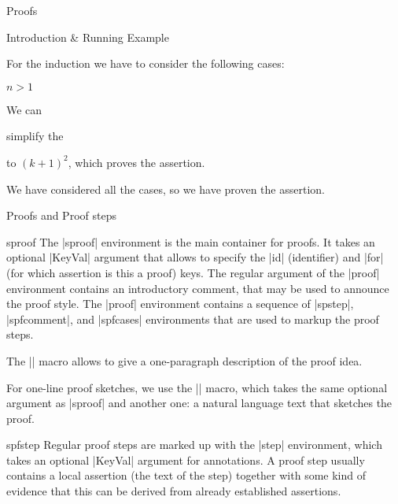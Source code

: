 \begin{sfragment}{Proofs}
\begin{sfragment}{Introduction \& Running Example}
\begin{mdframed}
\begin{sproof}[id=simple-proof]
\begin{spfcases}{For the induction we have to consider the following cases:}
\begin{spfcase}{$n>1$}
\begin{spfstep}[type=conclusion]
       We can \begin{justification}[method=simplify-eq]
         simplify the {}
       \end{justification} to $(k+1)^2$, which proves the assertion.
     \end{spfstep}
   \end{spfcase}
   \begin{spfstep}[type=conclusion]
     We have considered all the cases, so we have proven the assertion.
   \end{spfstep}
  \end{spfcases}
\end{sproof}
\end{mdframed}

\end{sfragment}

\begin{sfragment}{Proofs and Proof steps}

  \begin{environment}{sproof}
    The |sproof| environment is the main container for proofs. It takes an optional
    |KeyVal| argument that allows to specify the |id| (identifier) and |for| (for which
    assertion is this a proof) keys. The regular argument of the |proof| environment
    contains an introductory comment, that may be used to announce the proof style. The
    |proof| environment contains a sequence of |spstep|, |spfcomment|, and |spfcases|
    environments that are used to markup the proof steps.
  \end{environment}
  
  \begin{function}{\spfidea}
    The |\spfidea| macro allows to give a one-paragraph description of the proof idea.
  \end{function}
  
  \begin{function}{\spfsketch}
    For one-line proof sketches, we use the |\spfsketch| macro,
    which takes the same optional argument as |sproof| and another one: a natural language
    text that sketches the proof.
  \end{function}
  
  \begin{environment}{spfstep}
    Regular proof steps are marked up with the |step| environment, which takes an optional
    |KeyVal| argument for annotations. A proof step usually contains a local assertion
    (the text of the step) together with some kind of evidence that this can be derived
    from already established assertions.
  \end{environment}
  

\end{sfragment}
\end{sfragment}
